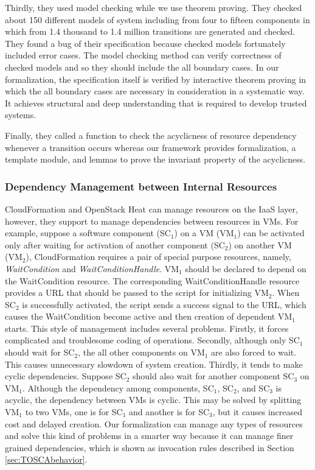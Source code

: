 \documentclass[12pt]{report}
\begin{document}
Thirdly, they used model checking while we use theorem proving. They
checked about 150 different models of system including from four to
fifteen components in which from 1.4 thousand to 1.4 million
transitions are generated and checked. They found a bug of their
specification because checked models fortunately included error
cases. The model checking method can verify correctness of checked
models and so they should include the all boundary cases. In our
formalization, the specification itself is verified by interactive
theorem proving in which the all boundary cases are necessary in
consideration in a systematic way. It achieves structural and deep
understanding that is required to develop trusted systems.

Finally, they called a function to check the acyclicness of resource
dependency whenever a transition occurs whereas our framework provides
formalization, a template module, and lemmas to prove the invariant
property of the acyclicness.

\subsubsection{Dependency Management between Internal Resources}
CloudFormation and OpenStack Heat can manage resources on the IaaS
layer, however, they support to manage dependencies between resources
in VMs. For example, suppose a software component (SC$_1$) on a
VM (VM$_1$) can be activated only after waiting for activation of
another component (SC$_2$) on another VM (VM$_2$), CloudFormation
requires a pair of special purpose resources, namely, {\it
  WaitCondition} and {\it WaitConditionHandle}. VM$_1$ should be
declared to depend on the WaitCondition resource. The corresponding
WaitConditionHandle resource provides a URL that should be passed to
the script for initializing VM$_2$. When SC$_2$ is successfully
activated, the script sends a success signal to the URL, which causes
the WaitCondition become active and then creation of dependent VM$_1$
starts. This style of management includes several problems. Firstly,
it forces complicated and troublesome coding of operations.  Secondly,
although only SC$_1$ should wait for SC$_2$, the all other components on
VM$_1$ are also forced to wait. This causes unnecessary slowdown of
system creation. Thirdly, it tends to make cyclic
dependencies. Suppose SC$_2$ should also wait for another component
SC$_3$ on VM$_1$. Although the dependency among components, SC$_1$,
SC$_2$, and SC$_3$ is acyclic, the dependency between VMs is
cyclic. This may be solved by splitting VM$_1$ to two VMs, one is for
SC$_1$ and another is for SC$_3$, but it causes increased cost and
delayed creation. Our formalization can manage any types of resources
and solve this kind of problems in a smarter way because it can manage
finer grained dependencies, which is shown as invocation rules
described in Section \ref{sec:TOSCAbehavior}.
\end{document}
